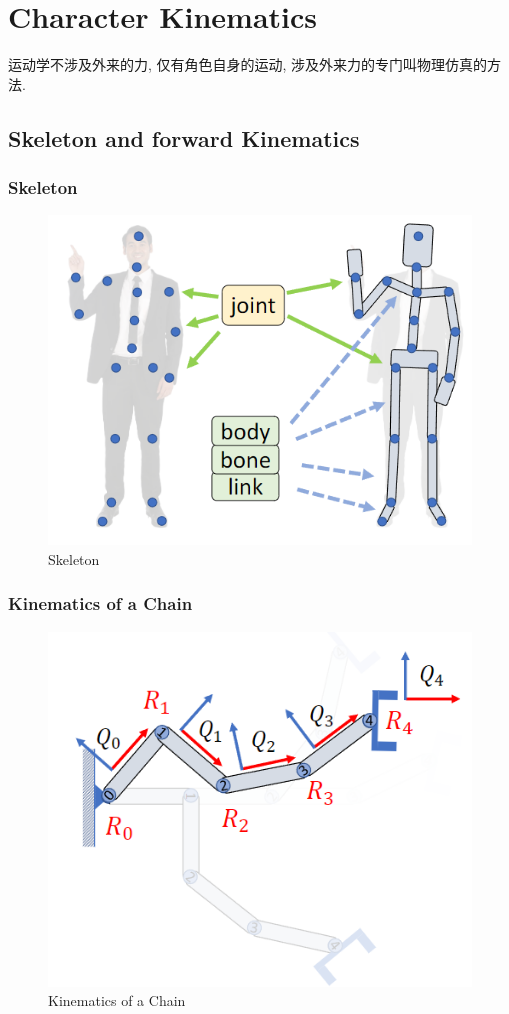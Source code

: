 \newpage
\section{Character Kinematics}
运动学不涉及外来的力, 仅有角色自身的运动, 涉及外来力的专门叫物理仿真的方法. 

\subsection{Skeleton and forward Kinematics}

\subsubsection{Skeleton}

\begin{figure}[!htb]
    \centering
    \includegraphics[width=0.618\linewidth]{pic/1053/Skeleton}
    \caption{Skeleton}
\end{figure}


\subsubsection{Kinematics of a Chain}

\begin{figure}[!htb]
    \centering
    \includegraphics[width=0.618\linewidth]{pic/1053/Kinematics of a Chain}
    \caption{Kinematics of a Chain}
\end{figure}

